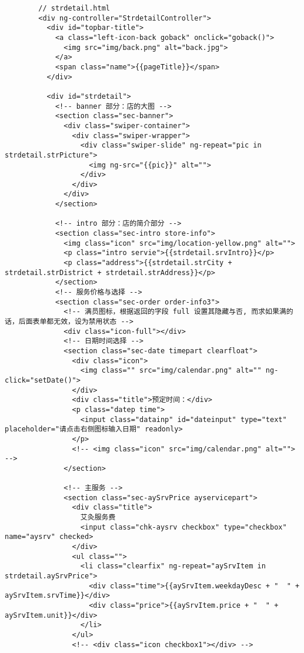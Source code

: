      \begin{lstlisting}
        // strdetail.html
        <div ng-controller="StrdetailController">
          <div id="topbar-title">
            <a class="left-icon-back goback" onclick="goback()">
              <img src="img/back.png" alt="back.jpg">
            </a>
            <span class="name">{{pageTitle}}</span>
          </div>

          <div id="strdetail">
            <!-- banner 部分：店的大图 -->
            <section class="sec-banner">
              <div class="swiper-container">
                <div class="swiper-wrapper">
                  <div class="swiper-slide" ng-repeat="pic in strdetail.strPicture">
                    <img ng-src="{{pic}}" alt="">
                  </div>
                </div>
              </div>
            </section>

            <!-- intro 部分：店的简介部分 -->
            <section class="sec-intro store-info">
              <img class="icon" src="img/location-yellow.png" alt="">
              <p class="intro servie">{{strdetail.srvIntro}}</p>
              <p class="address">{{strdetail.strCity + strdetail.strDistrict + strdetail.strAddress}}</p>
            </section>
            <!-- 服务价格与选择 -->
            <section class="sec-order order-info3">
              <!-- 满员图标，根据返回的字段 full 设置其隐藏与否, 而求如果满的话，后面表单都无效，设为禁用状态 -->
              <div class="icon-full"></div>
              <!-- 日期时间选择 -->
              <section class="sec-date timepart clearfloat">
                <div class="icon">
                  <img class="" src="img/calendar.png" alt="" ng-click="setDate()">
                </div>
                <div class="title">预定时间：</div>
                <p class="datep time">
                  <input class="datainp" id="dateinput" type="text" placeholder="请点击右侧图标输入日期" readonly>
                </p>
                <!-- <img class="icon" src="img/calendar.png" alt=""> -->
              </section>

              <!-- 主服务 -->
              <section class="sec-aySrvPrice ayservicepart">
                <div class="title">
                  艾灸服务费
                  <input class="chk-aysrv checkbox" type="checkbox" name="aysrv" checked>
                </div>
                <ul class="">
                  <li class="clearfix" ng-repeat="aySrvItem in strdetail.aySrvPrice">
                    <div class="time">{{aySrvItem.weekdayDesc + "  " + aySrvItem.srvTime}}</div>
                    <div class="price">{{aySrvItem.price + "  " + aySrvItem.unit}}</div>
                  </li>
                </ul>
                <!-- <div class="icon checkbox1"></div> -->


\end{lstlisting}
